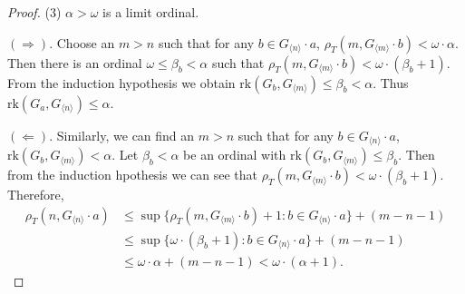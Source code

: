\documentclass[11pt]{amsart}
\theoremstyle{definition}
\theoremstyle{remark}
\numberwithin{equation}{section}
\def\gnb#1{G_{\langle #1\rangle}}
\def\rk{\mathrm{rk}}
\begin{document}
\begin{proof}
    (3) $\alpha>\omega$ is a limit ordinal.

    $(\Rightarrow)$. Choose an $m>n$ such that for any $b\in\gnb{n}\cdot a$, $\rho_T(m,\gnb{m}\cdot b)<\omega\cdot\alpha$. Then there is an ordinal $\omega\leq\beta_b<\alpha$ such that $\rho_T(m,\gnb{m}\cdot b)<\omega\cdot(\beta_b+1)$. From the induction hypothesis we obtain $\rk(G_b,\gnb{m})\leq\beta_b<\alpha$. Thus $\rk(G_a,\gnb{n})\leq\alpha$.

    $(\Leftarrow)$. Similarly, we can find an $m>n$ such that for any $b\in\gnb{n}\cdot a$, $\rk(G_b,\gnb{m})<\alpha$. Let $\beta_b<\alpha$ be an ordinal with $\rk(G_b,\gnb{m})\leq\beta_b$. Then from the induction hpothesis we can see that $\rho_T(m,\gnb{m}\cdot b)<\omega\cdot(\beta_b+1)$. Therefore,
    \begin{align*}
        \rho_T(n,\gnb{n}\cdot a)&\leq\sup\{\rho_T(m,\gnb{m}\cdot b)+1:b\in\gnb{n}\cdot a\}+(m-n-1)\\
        &\leq\sup\{\omega\cdot(\beta_b+1):b\in\gnb{n}\cdot a\}+(m-n-1)\\
        &\leq\omega\cdot\alpha+(m-n-1)<\omega\cdot(\alpha+1).
    \end{align*}
\end{proof}
\end{document}
